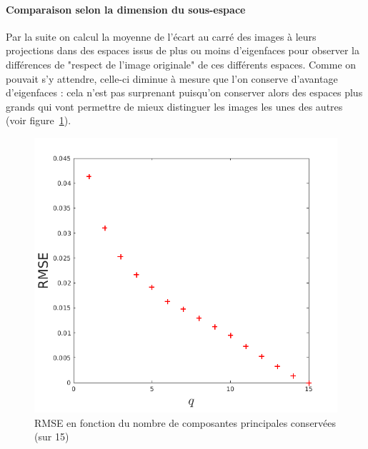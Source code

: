 \documentclass{article}
\begin{document}
\paragraph{Comparaison selon la dimension du sous-espace}
Par la suite on calcul la moyenne de l'écart au carré des images à leurs projections dans des espaces issus de plus ou moins d'eigenfaces pour observer la différences de "respect de l'image originale" de ces différents espaces. Comme on pouvait s'y attendre, celle-ci diminue à mesure que l'on conserve d'avantage d'eigenfaces : cela n'est pas surprenant puisqu'on conserver alors des espaces plus grands qui vont permettre de mieux distinguer les images les unes des autres (voir figure~\ref{rmse}).
\begin{figure}[!ht]
    \begin{center}
        \includegraphics[width=0.6\linewidth]{images/2-rmse.png}
        \caption{RMSE en fonction du nombre de composantes principales conservées (sur 15)}
        \label{rmse}
    \end{center}
\end{figure}
\end{document}
